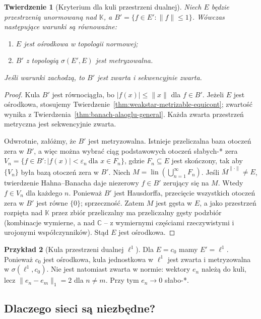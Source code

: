 \documentclass[11pt,a4paper]{article}
\numberwithin{equation}{section}
\theoremstyle{plain}
\newtheorem{twierdzenie}{Twierdzenie}[section]
\theoremstyle{definition}
\newtheorem{przyklad}[twierdzenie]{Przykład}
\theoremstyle{remark}
\newcommand{\C}{\mathbb C}
\newcommand{\K}{\mathbb K}
\begin{document}
\begin{twierdzenie}[Kryterium dla kuli przestrzeni dualnej]
\label{thm:banach-ball-metrizable-iff-separable}
Niech $E$ będzie przestrzenią unormowaną nad $\K$,
a $B'=\{f\in E':\|f\|\le1\}$. Wówczas następujące
warunki są równoważne:
\begin{enumerate}
\item $E$ jest ośrodkowa w topologii normowej;
\item $B'$ z topologią $\sigma(E',E)$ jest metryzowalna.
\end{enumerate}
Jeśli warunki zachodzą, to $B'$ jest zwarta i sekwencyjnie zwarta.
\end{twierdzenie}
\begin{proof}
Kula $B'$ jest równociągła, bo $|f(x)|\le\|x\|$ dla $f\in B'$.
Jeżeli $E$ jest ośrodkowa, stosujemy
Twierdzenie~\ref{thm:weakstar-metrizable-equicont};
zwartość wynika z Twierdzenia~\ref{thm:banach-alaoglu-general}.
Każda zwarta przestrzeń metryczna jest sekwencyjnie zwarta.

Odwrotnie, załóżmy, że $B'$ jest metryzowalna. Istnieje
przeliczalna baza otoczeń zera w $B'$, a więc można wybrać
ciąg podstawowych otoczeń słabych-* zera
$V_n=\{f\in B':|f(x)|<\varepsilon_n\ \text{dla }x\in F_n\}$,
gdzie $F_n\subseteq E$ jest skończony, tak aby $\{V_n\}$
była bazą otoczeń zera w $B'$. Niech
$M=\operatorname{lin}(\bigcup_{n=1}^\infty F_n)$.
Jeśli $\overline M^{\|\cdot\|}\ne E$, twierdzenie Hahna--Banacha
daje niezerowy $f\in B'$ zerujący się na $M$.
Wtedy $f\in V_n$ dla każdego $n$. Ponieważ $B'$ jest Hausdorffa,
przecięcie wszystkich otoczeń zera w $B'$ jest równe $\{0\}$;
sprzeczność. Zatem $M$ jest gęsta w $E$, a jako przestrzeń
rozpięta nad $\K$ przez zbiór przeliczalny ma przeliczalny
gęsty podzbiór (kombinacje wymierne, a nad $\C$ -- z
wymiernymi częściami rzeczywistymi i urojonymi współczynników).
Stąd $E$ jest ośrodkowa.
\end{proof}

\begin{przyklad}[Kula przestrzeni dualnej $\ell^1$]
Dla $E=c_0$ mamy $E'=\ell^1$. Ponieważ $c_0$ jest ośrodkowa,
kula jednostkowa w $\ell^1$ jest zwarta i metryzowalna
w $\sigma(\ell^1,c_0)$. Nie jest natomiast zwarta w normie:
wektory $e_n$ należą do kuli, lecz $\|e_n-e_m\|_1=2$
dla $n\ne m$. Przy tym $e_n\to0$ słabo-*.
\end{przyklad}

\subsection{Dlaczego sieci są niezbędne?}
\end{document}
